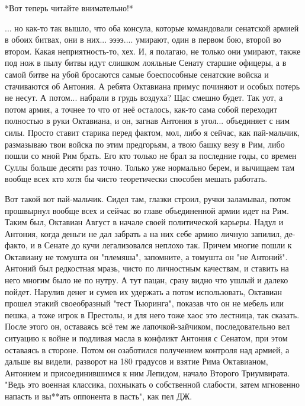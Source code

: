 *Вот теперь читайте внимательно!*


... но как-то так вышло, что оба консула, которые командовали сенатской армией в обоих битвах, они в них... ээээ.... умирают, один в первом бою, второй во втором. Какая неприятность-то, хех. И, я полагаю, не только они умирают, также под нож в пылу битвы идут слишком лояльные Сенату старшие офицеры, а в самой битве на убой бросаются самые боеспособные сенатские войска и стачиваются об Антония. А ребята Октавиана примус починяют и особых потерь не несут. А потом... набрали в грудь воздуха? Щас смешно будет. Так уот, а потом армия, а точнее то что от неё осталось, как-то сама собой переходит полностью в руки Октавиана, и он, загнав Антония в угол... объединяет с ним силы. Просто ставит старика перед фактом, мол, либо я сейчас, как пай-мальчик, размазываю твои войска по этим предгорьям, а твою башку везу в Рим, либо пошли со мной Рим брать. Его кто только не брал за последние годы, со времен Суллы больше десяти раз точно. Только уже нормально берем, и вычищаем там вообще всех кто хотя бы чисто теоретически способен мешать работать.


Вот такой вот пай-мальчик. Сидел там, глазки строил, ручки заламывал, потом прошвырнул вообще всех и сейчас во главе объединенной армии идет на Рим. Таким был, Октавиан Август в начале своей политической карьеры. Надул и Антония, когда деньги не дал забрать а на них себе армию личную запилил, де-факто, и в Сенате до кучи легализовался неплохо так. Причем многие пошли к Октавиану не томушта он "племяша", запомните, а томушта он "не Антоний". Антоний был редкостная мразь, чисто по личностным качествам, и ставить на него многим было не по нутру. А тут пацан, сразу видно что ушлый и далеко пойдет. Нарулив денег и сумев их удержать а потом использовать, Октавиан прошел этакий своеобразный "тест Тьюринга", показав что он не мебель или пешка, а тоже игрок в Престолы, и для него тоже хаос это лестница, так сказать. После этого он, оставаясь всё тем же лапочкой-зайчиком, последовательно вел ситуацию к войне и подливая масла в конфликт Антония с Сенатом, при этом оставаясь в стороне. Потом он озаботился получением контроля над армией, а дальше вы видели, разворот на 180 градусов и взятие Рима Октавианом, Антонием и присоединившимся к ним Лепидом, начало Второго Триумвирата. "Ведь это военная классика, похныкать о собственной слабости, затем мгновенно напасть и вы**ать оппонента в пасть", как пел ДЖ.


